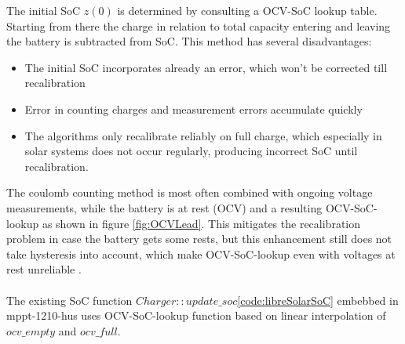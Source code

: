 The initial SoC $z(0)$ is determined by consulting a OCV-SoC lookup table. Starting from there the charge in relation to total capacity entering and leaving the battery is subtracted from SoC. This method has several disadvantages: \\

\begin{itemize}
\item The initial SoC incorporates already an error, which won't be corrected till recalibration \\
\item Error in counting charges and measurement errors accumulate quickly\\
\item The algorithms only recalibrate reliably on full charge, which especially in solar systems does not occur regularly, producing incorrect SoC until recalibration. \\ %
\end{itemize}
The coulomb counting method is most often combined with ongoing voltage measurements, while the battery is at rest (OCV) and a resulting OCV-SoC-lookup as shown in figure \ref{fig:OCVLead}. This mitigates the recalibration problem in case the battery gets some rests, but this enhancement still does not take hysteresis into account, which make OCV-SoC-lookup even with voltages at rest unreliable \cite{6861809} \cite{khan2016hysteresis}. %
\\
\\
The existing SoC function \href{https://github.com/LibreSolar/charge-controller-firmware/blob/5196694e42c38eee18ab25e65bd51ec578eba101/src/bat_charger.cpp\#L325}{$Charger::update\_soc$}\ref{code:libreSolarSoC}  embebbed in mppt-1210-hus uses OCV-SoC-lookup function based on linear interpolation of $ocv\_empty$ and $ocv\_full$.



